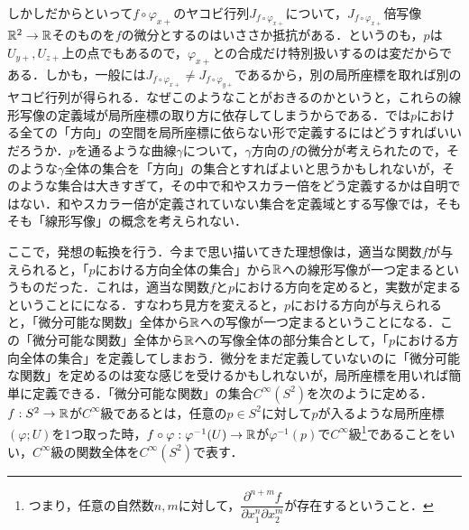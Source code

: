 しかしだからといって$f\circ \varphi_{x+}$のヤコビ行列$J_{f\circ \varphi_{x+}}$について，$J_{f\circ\varphi_{x+}}$倍写像${\mathbb R}^2\rightarrow {\mathbb R}$そのものを$f$の微分とするのはいささか抵抗がある．というのも，$p$は$U_{y+},U_{z+}$上の点でもあるので，$\varphi_{x+}$との合成だけ特別扱いするのは変だからである．しかも，一般には$J_{f\circ\varphi_{x+}}\neq J_{f\circ\varphi_{y+}}$であるから，別の局所座標を取れば別のヤコビ行列が得られる．なぜこのようなことがおきるのかというと，これらの線形写像の定義域が局所座標の取り方に依存してしまうからである．では$p$における全ての「方向」の空間を局所座標に依らない形で定義するにはどうすればいいだろうか．$p$を通るような曲線$\gamma$について，$\gamma$方向の$f$の微分が考えられたので，そのような$\gamma$全体の集合を「方向」の集合とすればよいと思うかもしれないが，そのような集合は大きすぎて，その中で和やスカラー倍をどう定義するかは自明ではない．和やスカラー倍が定義されていない集合を定義域とする写像では，そもそも「線形写像」の概念を考えられない．


ここで，発想の転換を行う．今まで思い描いてきた理想像は，適当な関数$f$が与えられると，「$p$における方向全体の集合」から${\mathbb R}$への線形写像が一つ定まるというものだった．これは，適当な関数$f$と$p$における方向を定めると，実数が定まるということにになる．すなわち見方を変えると，$p$における方向が与えられると，「微分可能な関数」全体から${\mathbb R}$への写像が一つ定まるということになる．この「微分可能な関数」全体から${\mathbb R}$への写像全体の部分集合として，「$p$における方向全体の集合」を定義してしまおう．微分をまだ定義していないのに「微分可能な関数」を定めるのは変な感じを受けるかもしれないが，局所座標を用いれば簡単に定義できる．「微分可能な関数」の集合$C^\infty(S^2)$を次のように定める．$f:S^2\rightarrow {\mathbb R}$が$C^{\infty}$級であるとは，任意の$p\in S^2$に対して$p$が入るような局所座標$(\varphi;U)$を1つ取った時，$f\circ\varphi:\varphi^{-1}(U)\rightarrow {\mathbb R}$が$\varphi^{-1}(p)$で$C^{\infty}$級\footnote{つまり，任意の自然数$n,m$に対して，$\dfrac{\partial^{n+m}f}{\partial x_1^n\partial x_2^m}$が存在するということ．}であることをいい，$C^\infty$級の関数全体を$C^\infty(S^2)$で表す．


